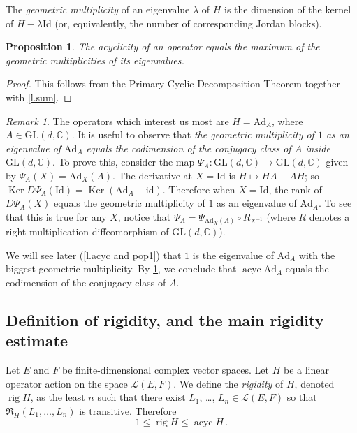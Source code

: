 \documentclass[10pt, a4paper]{amsart}
\theoremstyle{plain}
\newtheorem{prop}[lemma]{Proposition}
\theoremstyle{definition}
\theoremstyle{remark}
\theoremstyle{note}
\newtheorem{rem}[lemma]{Remark}
\numberwithin{equation}{section}
\begin{document}
\medskip

The \emph{geometric multiplicity} of an eigenvalue $\lambda$ of $H$ is the 
dimension of the kernel of $H - \lambda {\mathrm{Id}}$
(or, equivalently, the number of corresponding Jordan blocks).

\begin{prop}\label{p.acyc}   
The acyclicity of an operator equals the maximum of the geometric multiplicities of its eigenvalues.
\end{prop}

\begin{proof} 
This follows from the Primary Cyclic Decomposition Theorem 
together with \cref{l.sum}.
\end{proof}

\begin{rem}\label{r.conjugacy_class}
The operators which interest us most are $H = {\mathrm{Ad}}_A$, where $A \in {\mathrm{GL}}(d,{\mathbb{C}})$.
It is useful to observe that \emph{the geometric multiplicity of $1$ 
as an eigenvalue of ${\mathrm{Ad}}_A$ equals the codimension of the conjugacy class of $A$ inside ${\mathrm{GL}}(d,{\mathbb{C}})$}.
To prove this, consider the map $\Psi_A \colon {\mathrm{GL}}(d,{\mathbb{C}}) \to {\mathrm{GL}}(d,{\mathbb{C}})$ given by 
$\Psi_A(X) = {\mathrm{Ad}}_X(A)$.
The derivative at $X={\mathrm{Id}}$ is $H \mapsto HA-AH$; so
$\operatorname{Ker} D\Psi_A ({\mathrm{Id}}) = \operatorname{Ker} ({\mathrm{Ad}}_A - {\mathrm{id}})$.
Therefore when $X={\mathrm{Id}}$, the rank of $D\Psi_A (X)$ equals 
the geometric multiplicity of $1$ as an eigenvalue of ${\mathrm{Ad}}_A$.
To see that this is true for any $X$, notice that $\Psi_A = \Psi_{{\mathrm{Ad}}_X(A)} \circ R_{X^{-1}}$
(where $R$ denotes a right-multiplication diffeomorphism of ${\mathrm{GL}}(d,{\mathbb{C}})$).

We will see later (\cref{l.acyc and pop1}) that $1$ is the eigenvalue of ${\mathrm{Ad}}_A$
with the biggest geometric multiplicity.
By \cref{p.acyc}, we conclude that $\operatorname{acyc} {\mathrm{Ad}}_A$ equals 
the codimension of the conjugacy class of $A$.
\end{rem}

\subsection{Definition of rigidity, and the main rigidity estimate}

Let $E$ and $F$ be finite-dimensional complex vector spaces.
Let $H$ be a linear operator action on the space $\mathcal{L}(E,F)$.
We define the \emph{rigidity} of $H$, denoted $\operatorname{rig} H$,
as the least $n$ such that there exist $L_1$, \dots, $L_n \in \mathcal{L}(E,F)$ so that
${\mathfrak{R}}_H(L_1 , \dots, L_n)$ is transitive.
Therefore
$$
1 \le \operatorname{rig} H \le \operatorname{acyc} H \, .
$$
\end{document}
